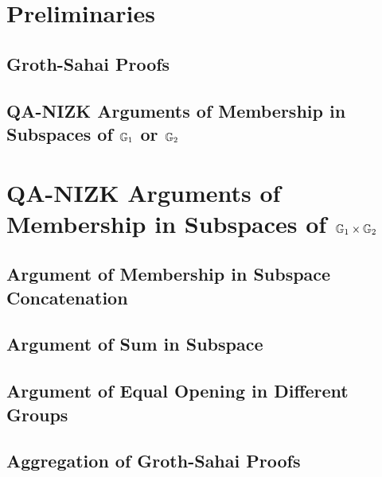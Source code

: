 \chapter{Preliminaries}

    \section{Groth-Sahai Proofs}\label{sec:gs-proofs}

    \section{QA-NIZK Arguments of Membership in Subspaces of $\mathbb{G}_1$ or $\mathbb{G}_2$} \label{sect:QANIZKlinspace}

    
\chapter{QA-NIZK Arguments of Membership in Subspaces of $\mathbb{G}_1\times\mathbb{G}_2$}\label{sec:agg-asym}
    
    

    \section{Argument of Membership in Subspace Concatenation}\label{sec:concat}

        

    \section{Argument of Sum in Subspace}\label{sec:sum}
        
        

    \section{Argument of Equal Opening in Different Groups} \label{sec:aggcommit}

         

    \section{Aggregation of Groth-Sahai Proofs}\label{sec:agg-gs}

        

